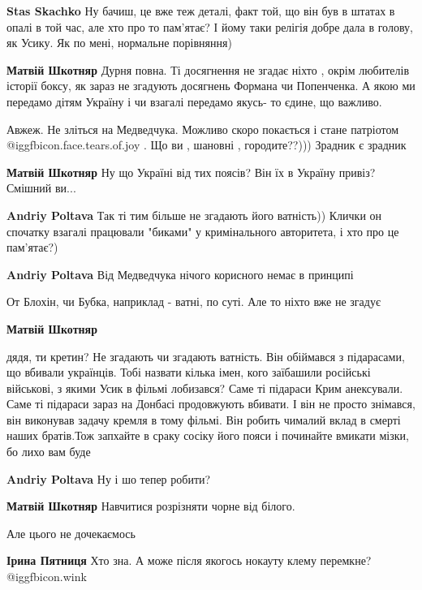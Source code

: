 \begin{itemize}
\begin{itemize}
\textbf{Stas Skachko} Ну бачиш, це вже теж деталі, факт той, що він був в штатах в опалі в той час, але хто про то пам'ятає?
І йому таки релігія добре дала в голову, як Усику.
Як по мені, нормальне порівняння)

\textbf{Матвій Шкотняр} Дурня повна. Ті досягнення не згадає ніхто , окрім любителів історії боксу, як зараз не згадують досягнень Формана чи Попенченка. А якою ми передамо дітям Україну і чи взагалі передамо якусь- то єдине, що важливо.

Авжеж. Не зліться на Медведчука. Можливо скоро покається і стане патріотом @igg{fbicon.face.tears.of.joy} . Що ви , шановні , городите??))) Зрадник є зрадник

\textbf{Матвій Шкотняр} Ну що Україні від тих поясів? Він їх в Україну привіз? Смішний ви...

\textbf{Andriy Poltava} Так ті тим більше не згадають його ватність))
Клички он спочатку взагалі працювали "биками" у кримінального авторитета, і хто про це пам'ятає?)

\textbf{Andriy Poltava} Від Медведчука нічого корисного немає в принципі

От Блохін, чи Бубка, наприклад - ватні, по суті. Але то ніхто вже не згадує

\textbf{Матвій Шкотняр} 

дядя, ти кретин? Не згадають чи згадають ватність. Він обіймався з підарасами,
що вбивали українців. Тобі назвати кілька імен, кого заїбашили російські
військові, з якими Усик в фільмі лобизався? Саме ті підараси Крим анексували.
Саме ті підараси зараз на Донбасі продовжують вбивати. І він не просто
знімався, він виконував задачу кремля в тому фільмі. Він робить чималий вклад в
смерті наших братів.Тож запхайте в сраку сосіку його пояси і починайте вмикати
мізки, бо лихо вам буде


\textbf{Andriy Poltava} Ну і шо тепер робити?

\textbf{Матвій Шкотняр} Навчитися розрізняти чорне від білого.

\end{itemize} %

Але цього не дочекаємось

\begin{itemize} %
\textbf{Ірина Пятниця} Хто зна. А може після якогось нокауту клему перемкне?  @igg{fbicon.wink} 


\end{itemize}
\end{itemize}
